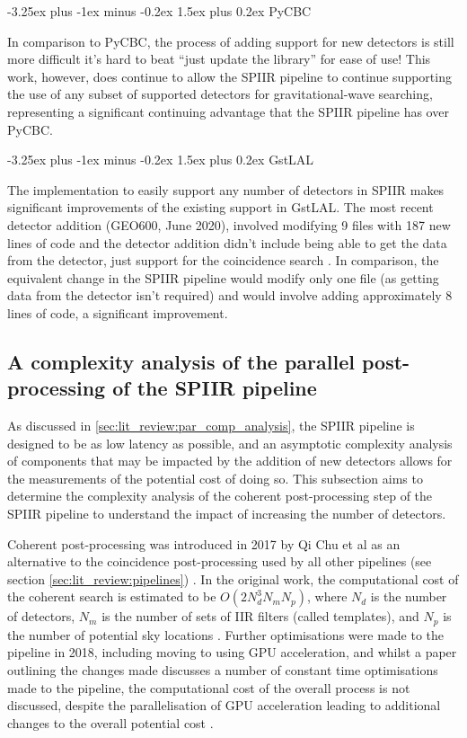 \documentclass{article}
\makeatletter
\renewcommand{\paragraph}{\@startsection{paragraph}{4}{0ex}%
    {-3.25ex plus -1ex minus -0.2ex}%
    {1.5ex plus 0.2ex}%
    {\normalfont\normalsize\bfseries}}
\makeatother
\begin{document}
\paragraph{PyCBC}

In comparison to PyCBC, the process of adding support for new detectors is still more difficult \textemdash{} it's hard to beat ``just update the library'' for ease of use!
This work, however, does continue to allow the SPIIR pipeline to continue supporting the use of any subset of supported detectors for gravitational-wave searching, representing a significant continuing advantage that the SPIIR pipeline has over PyCBC.

\paragraph{GstLAL}

The implementation to easily support any number of detectors in SPIIR makes significant improvements of the existing support in GstLAL.
The most recent detector addition (GEO600, June 2020), involved modifying 9 files with 187 new lines of code \textemdash{} and the detector addition didn't include being able to get the data from the detector, just support for the coincidence search \cite{messick}.
In comparison, the equivalent change in the SPIIR pipeline would modify only one file (as getting data from the detector isn't required) and would involve adding approximately 8 lines of code, a significant improvement.

\subsection{A complexity analysis of the parallel post-processing of the SPIIR pipeline} \label{sec:discuss:analysis}

As discussed in \ref{sec:lit_review:par_comp_analysis}, the SPIIR pipeline is designed to be as low latency as possible, and an asymptotic complexity analysis of components that may be impacted by the addition of new detectors allows for the measurements of the potential cost of doing so.
This subsection aims to determine the complexity analysis of the coherent post-processing step of the SPIIR pipeline to understand the impact of increasing the number of detectors.

Coherent post-processing was introduced in 2017 by Qi Chu et al as an alternative to the coincidence post-processing used by all other pipelines (see section \ref{sec:lit_review:pipelines}) \cite{ChuThesis}.
In the original work, the computational cost of the coherent search is estimated to be \(O(2N^3_dN_mN_p)\), where \(N_d\) is the number of detectors, \(N_m\) is the number of sets of IIR filters (called templates), and \(N_p\) is the number of potential sky locations \cite{ChuThesis}.
Further optimisations were made to the pipeline in 2018, including moving to using GPU acceleration, and whilst a paper outlining the changes made discusses a number of constant time optimisations made to the pipeline, the computational cost of the overall process is not discussed, despite the parallelisation of GPU acceleration leading to additional changes to the overall potential cost \cite{SPIIRGPU2018}.
\end{document}
